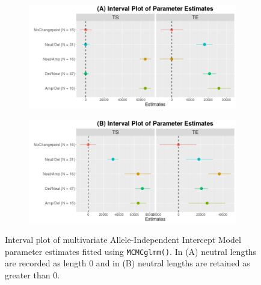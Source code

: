 \begin{figure}[!htb]
\vspace{0.5cm}
     \begin{subfigure}[t]{.49\textwidth}
      \centering
      \includegraphics[width = 1\textwidth]{../figures/Chapter_5/Multivariate_MCMC_7_AI_Interval.png}
    \end{subfigure}%
     \begin{subfigure}[t]{.49\textwidth}
      \centering
       \includegraphics[width = 1\textwidth]{../figures/Chapter_5/Multivariate_MCMC_7_Neut_AI_Interval.png}
    \end{subfigure} 
     \caption[Interval plot of multivariate Allele-Independent Intercept Model parameter estimates fitted using \texttt{MCMCglmm()}.]{Interval plot of multivariate Allele-Independent Intercept Model parameter estimates fitted using \texttt{MCMCglmm()}. In (A) neutral lengths are recorded as length 0 and in (B) neutral lengths are retained as greater than 0.}
\end{figure}


